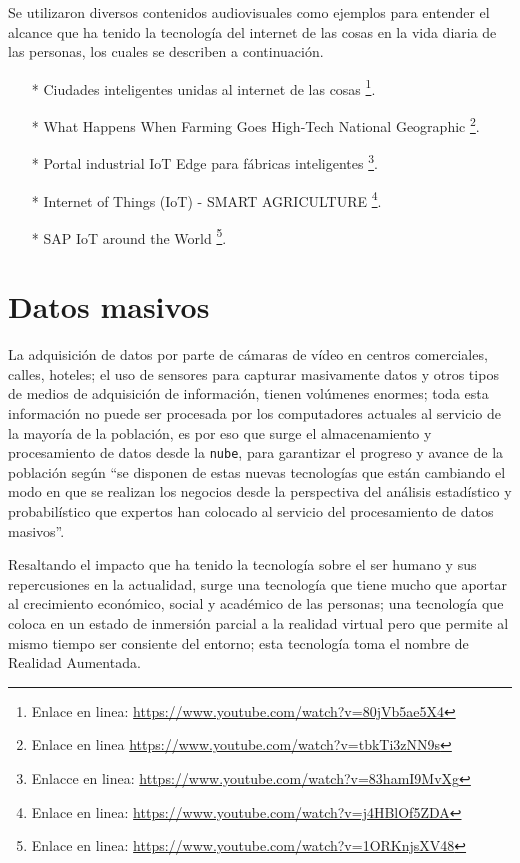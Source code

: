\documentclass[jou]{apa6} %
\begin{document}
\bigskip

Se utilizaron diversos contenidos audiovisuales como ejemplos para entender el alcance que ha tenido la tecnología del internet de las cosas en la vida diaria de las personas, los cuales se describen a continuación.
\begin{enumerate}
\item[*] Ciudades inteligentes unidas al internet de las cosas \footnote{Enlace en linea: \url{https://www.youtube.com/watch?v=80jVb5ae5X4}}.
\item[*] What Happens When Farming Goes High-Tech National Geographic \footnote{Enlace en linea \url {https://www.youtube.com/watch?v=tbkTi3zNN9s}}.
\item[*] Portal industrial IoT Edge para fábricas inteligentes \footnote{Enlacce en linea: \url{https://www.youtube.com/watch?v=83hamI9MvXg}}.
\item[*] Internet of Things (IoT) - SMART AGRICULTURE \footnote{Enlace en linea: \url{https://www.youtube.com/watch?v=j4HBlOf5ZDA}}.
\item[*] SAP IoT around the World \footnote{Enlace en linea: \url{https://www.youtube.com/watch?v=1ORKnjsXV48}}.
\end{enumerate}

\section{Datos masivos}
La adquisición de datos por parte de cámaras de vídeo en centros comerciales, calles, hoteles; el uso de sensores para capturar masivamente datos y otros tipos de medios de adquisición de información, tienen volúmenes enormes; toda esta información no puede ser procesada por los computadores actuales al servicio de la mayoría de la población, es por eso que surge el almacenamiento y procesamiento de datos desde la \texttt{nube}, para garantizar el progreso y avance de la población según \cite{malvicino2014big} ``se  disponen de estas nuevas tecnologías que están cambiando el modo en que se realizan los negocios desde la perspectiva del análisis estadístico y probabilístico que expertos han colocado al servicio del procesamiento de datos masivos''.

\bigskip

Resaltando el impacto que ha tenido la tecnología sobre el ser humano y sus repercusiones en la actualidad, surge una tecnología que tiene mucho que aportar al crecimiento económico, social y académico de las personas; una tecnología que coloca en un estado de inmersión parcial a la realidad virtual pero que permite al mismo tiempo ser consiente del entorno; esta tecnología toma el nombre de Realidad Aumentada.
\end{document}
